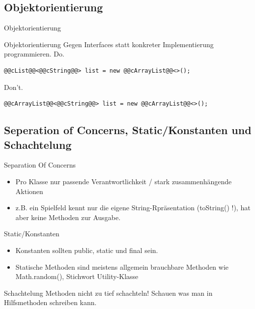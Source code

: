 \documentclass[aspectratio=169]{beamer}
\begin{document}
\subsection{Objektorientierung}
\begin{frame}[fragile]{Objektorientierung}
  \begin{block}{Objektorientierung}
    Gegen Interfaces statt konkreter Implementierung programmieren. \linebreak
    \pause
    \color{nicegreen}Do.\color{FGround}
    \begin{lstlisting}[numbers=none]
@@cList@@<@@cString@@> list = new @@cArrayList@@<>();
    \end{lstlisting}
    \pause
    \color{alertcolor}Don't.\color{FGround}
    \begin{lstlisting}[numbers=none]
@@cArrayList@@<@@cString@@> list = new @@cArrayList@@<>();
    \end{lstlisting}
  \end{block}
\end{frame}

\subsection{Seperation of Concerns, Static/Konstanten und Schachtelung}
\begin{frame}
  \begin{block}{Separation Of Concerns}
    \begin{itemize}
      \pause
      \item Pro Klasse nur passende Verantwortlichkeit / stark zusammenhängende Aktionen
      \pause
      \item z.B. ein Spielfeld kennt nur die eigene String-Rpräsentation (toString() !), hat aber keine Methoden zur Ausgabe.
    \end{itemize}
  \end{block}
  \pause
  \begin{block}{Static/Konstanten}
    \begin{itemize}
      \pause
      \item Konstanten sollten 
      \color{keywordcolor}public\color{FGround}, \color{keywordcolor}static \color{FGround} und \color{keywordcolor}final \color{FGround} sein.
      \pause
      \item Statische Methoden sind meistens allgemein brauchbare Methoden wie Math.random(), Stichwort Utility-Klasse
    \end{itemize}
  \end{block}
  \pause
  \begin{block}{Schachtelung}
    Methoden nicht zu tief schachteln! Schauen was man in Hilfsmethoden schreiben kann.
  \end{block}
\end{frame}
\end{document}
